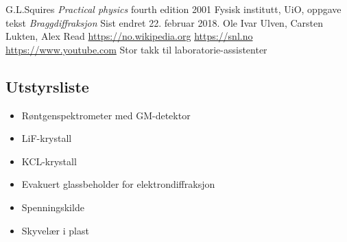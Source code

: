 \documentclass[norsk,a4paper,12pt]{article}
\begin{document}
\begin{thebibliography}{}
	G.L.Squires
	\textit{Practical physics}
	fourth edition
	2001
	Fysisk institutt, UiO, oppgave tekst
	\textit{Braggdiffraksjon}
	Sist endret 22. februar 2018. Ole Ivar Ulven, Carsten Lukten, Alex Read
	\url{https://no.wikipedia.org}
	\url{https://snl.no}
	\url{https://www.youtube.com}
	Stor takk til laboratorie-assistenter
\end{thebibliography}

\begin{appendices}
\appendix
\section{Utstyrsliste}
\begin{multicols}{2}
\begin{itemize}
  	\item Røntgenspektrometer med GM-detektor
  	\item LiF-krystall
  	\item KCL-krystall
  	\item Evakuert glassbeholder for elektrondiffraksjon
  	\item Spenningskilde
  	\item Skyvelær i plast
\end{itemize}
\end{multicols}


\end{appendices}
\end{document}

